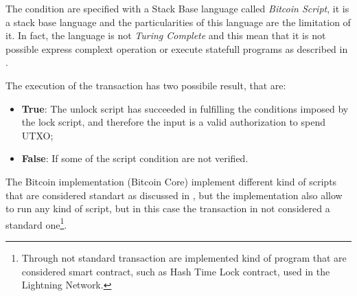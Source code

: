 The condition are specified with a Stack Base language called \emph{Bitcoin Script},
it is a stack base language and the particularities of this language are the
limitation of it. 
In fact, the language is not \emph{Turing Complete} and this mean that it is 
not possible express complext operation or execute statefull programs as described 
in \cite{Palazzo_Estrazione_di_Informazioni_2021}.

The execution of the transaction has two possibile result, that are: 

\begin{itemize}
    \item {\bf True}: The unlock script has succeeded in fulfilling the 
        conditions imposed by the lock script, 
        and therefore the input is a valid authorization to spend UTXO;
    \item {\bf False}: If some of the script condition are not verified.
\end{itemize}

The Bitcoin implementation (Bitcoin Core) implement different kind of scripts
that are considered standart as discussed in \cite{Palazzo_Estrazione_di_Informazioni_2021},
but the implementation also allow to run any kind of script, but in this case
the transaction in not considered a standard one\footnote{Through not standard transaction are 
implemented kind of program that are considered smart contract, such as Hash Time Lock contract, 
used in the Lightning Network.}.

